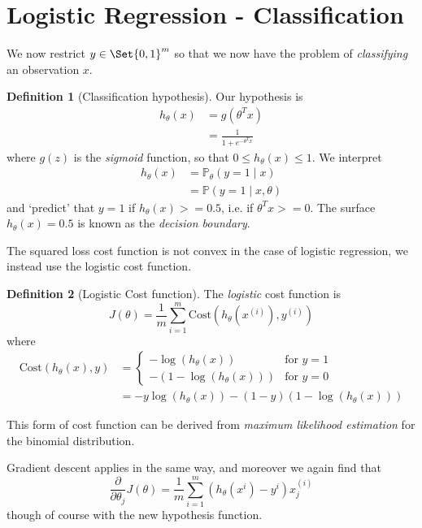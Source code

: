 \documentclass[a4paper,12pt]{article}
\theoremstyle{definition}
\newtheorem*{defn}{Definition}
\renewcommand{\Pr}{\mathbb{P}}
\providecommand\given{} %
\renewcommand{\given}{\mid}
\begin{document}
\section{Logistic Regression - Classification}
We now restrict $y \in \Set{0, 1}^{m}$ so that we now have the problem of \emph{classifying} an observation $x$.

\begin{defn}[Classification hypothesis]
Our hypothesis is 
\begin{align*}
h_{\theta}(x) &= g(\theta^T x) \\
&= \frac{1}{1 + e^{-\theta^{T} x}}
\end{align*}
where $g(z)$ is the \emph{sigmoid} function, so that $0 \leq h_{\theta}(x) \leq 1$. We interpret
\begin{align*}
h_{\theta}(x) &= \Pr_{\theta}(y = 1 \given x) \\
&= \Pr(y = 1 \given x, \theta)
\end{align*}
and `predict' that $y = 1$ if $h_{\theta}(x) >= 0.5$, i.e. if $\theta^{T} x >= 0$. The surface $h_{\theta}(x) = 0.5$ is known as the \emph{decision boundary}.
\end{defn}

The squared loss cost function is not convex in the case of logistic regression, we instead use the logistic cost function. 
\begin{defn}[Logistic Cost function]
The \emph{logistic} cost function is
\[
J(\theta) = \frac{1}{m} \sum_{i=1}^{m} \mathrm{Cost}(h_{\theta}(x^{(i)}), y^{(i)})
\]
where
\begin{align*}
\mathrm{Cost}(h_{\theta}(x), y) & = 
\begin{cases}
-\log(h_{\theta}(x)) & \text{for } y = 1 \\
-(1 - \log(h_{\theta}(x))) & \text{for } y = 0
\end{cases} \\
& = - y \log(h_{\theta}(x)) - (1 - y)(1 - \log(h_{\theta}(x)))
\end{align*}
\end{defn}

This form of cost function can be derived from \emph{maximum likelihood estimation} for the binomial distribution.

Gradient descent applies in the same way, and moreover we again find that
\[
\frac{\partial}{\partial \theta_j} J(\theta) = \frac{1}{m} \sum_{i=1}^{m}{ \left( h_{\theta}(x^{i}) - y^{i}\right) x^{(i)}_j }
\]
though of course with the new hypothesis function.
\end{document}
